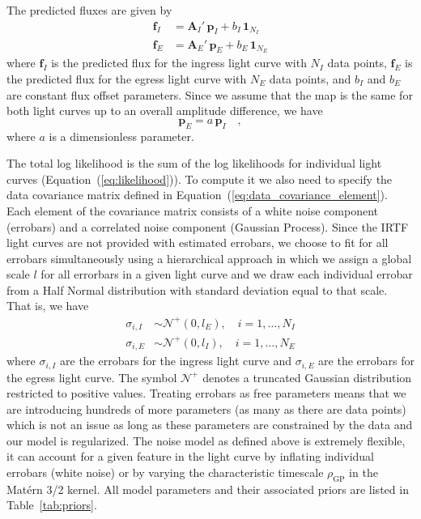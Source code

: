 \documentclass[linenumbers,modern]{aastex62}
\begin{document}
The predicted fluxes are given by 
\begin{align}
    \mathbf{f}_I&=\mathbf{A}_I'\,\mathbf{p}_I +b_I\,\mathbf{1}_{N_I}\\
    \mathbf{f}_E&=\mathbf{A}_E'\,\mathbf{p}_E +b_E\,\mathbf{1}_{N_E}
\end{align}
where $\mathbf{f}_I$ is the predicted flux for the ingress light curve with $N_I$ data points, $\mathbf{f}_E$ is the predicted flux for the egress light curve with $N_E$ data points, and $b_I$ and $b_E$ are constant flux offset parameters.
Since we assume that the map is the same for both light curves up to an overall amplitude difference, we have
\begin{equation}
    \mathbf{p}_E=a\,\mathbf{p}_I
    \quad,
\end{equation}
where $a$ is a dimensionless parameter.

The total log likelihood is the sum of the log likelihoods for individual light curves (Equation~(\ref{eq:likelihood})). 
To compute it we also need to specify the data covariance matrix defined in Equation~(\ref{eq:data_covariance_element}).
Each element of the covariance matrix consists of a white noise component (errobars) and a correlated noise component (Gaussian Process).
Since the IRTF light curves are not provided with estimated errobars, we choose to fit for all errobars simultaneously using a hierarchical approach in which we assign a global scale $l$ for all errorbars in a given light curve and we draw each individual errobar from a Half Normal distribution with standard deviation equal to that scale.
That is, we have 
\begin{align}
    \sigma_{i,I}&\sim \mathcal{N}^+(0, l_E),\quad i=1,\dots,N_I\\
    \sigma_{i,E}&\sim \mathcal{N}^+(0,l_I),\quad i=1,\dots, N_E
\end{align}
where $\sigma_{i,I}$ are the errobars for the ingress light curve and $\sigma_{i,E}$ are the errobars for the egress light curve.
The symbol $\mathcal{N}^+$ denotes a truncated Gaussian distribution restricted to positive values.
Treating errobars as free parameters means that we are introducing hundreds of more parameters (as many as there are data points) which is not an issue as long as these parameters are constrained by the data and our model is regularized.
The noise model as defined above is extremely flexible, it can account for a given feature in the light curve by inflating individual errobars (white noise) or by varying the characteristic timescale $\rho_\mathrm{GP}$ in the Mat\'ern 3/2 kernel.
All model parameters and their associated priors are listed in Table~\ref{tab:priors}. 
\end{document}

